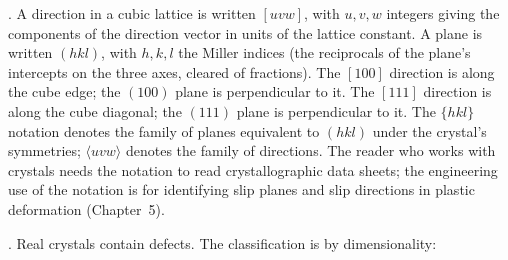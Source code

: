 . A direction in a cubic lattice is
written $[uvw]$, with $u, v, w$ integers giving the components of the
direction vector in units of the lattice constant. A plane is written
$(hkl)$, with $h, k, l$ the Miller indices (the reciprocals of the
plane's intercepts on the three axes, cleared of fractions). The
$[100]$ direction is along the cube edge; the $(100)$ plane is
perpendicular to it. The $[111]$ direction is along the cube diagonal;
the $(111)$ plane is perpendicular to it. The $\{hkl\}$ notation
denotes the family of planes equivalent to $(hkl)$ under the
crystal's symmetries; $\langle uvw \rangle$ denotes the family of
directions. The reader who works with crystals needs the notation to
read crystallographic data sheets; the engineering use of the notation
is for identifying slip planes and slip directions in plastic
deformation (Chapter~5).

. Real crystals contain defects. The classification
is by dimensionality:

